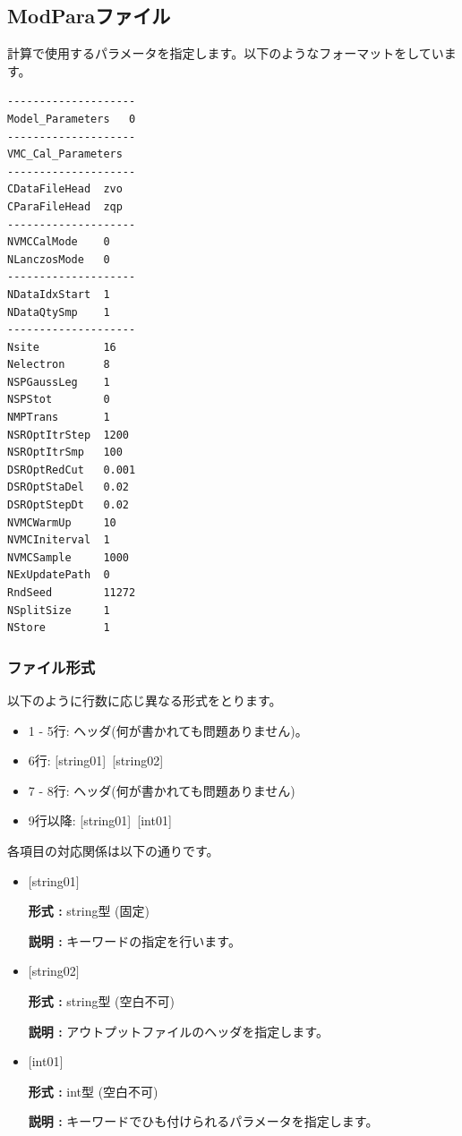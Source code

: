 \newpage
\subsection{ModParaファイル}
\label{Subsec:modpara}
計算で使用するパラメータを指定します。以下のようなフォーマットをしています。\\
\begin{minipage}{10cm}
\begin{screen}
\begin{verbatim}
--------------------
Model_Parameters   0
--------------------
VMC_Cal_Parameters
--------------------
CDataFileHead  zvo
CParaFileHead  zqp
--------------------
NVMCCalMode    0
NLanczosMode   0
--------------------
NDataIdxStart  1
NDataQtySmp    1
--------------------
Nsite          16
Nelectron      8
NSPGaussLeg    1
NSPStot        0
NMPTrans       1
NSROptItrStep  1200
NSROptItrSmp   100
DSROptRedCut   0.001
DSROptStaDel   0.02
DSROptStepDt   0.02
NVMCWarmUp     10
NVMCIniterval  1
NVMCSample     1000
NExUpdatePath  0
RndSeed        11272
NSplitSize     1
NStore         1  
\end{verbatim}
\end{screen}
\end{minipage}

\subsubsection{ファイル形式}
以下のように行数に応じ異なる形式をとります。
 \begin{itemize}
   \item  1 - 5行:  ヘッダ(何が書かれても問題ありません)。
   \item  6行:  [string01]~[string02]
   \item  7 - 8行: ヘッダ(何が書かれても問題ありません)
   \item  9行以降: [string01]~[int01]
  \end{itemize}
各項目の対応関係は以下の通りです。
\begin{itemize}
   \item  $[$string01$]$
   
   {\bf 形式 :} string型 (固定)

  {\bf 説明 :} キーワードの指定を行います。
   
   \item  $[$string02$]$
   
   {\bf 形式 :} string型 (空白不可)

  {\bf 説明 :} アウトプットファイルのヘッダを指定します。

   \item  $[$int01$]$
   
   {\bf 形式 :} int型 (空白不可)

  {\bf 説明 :} キーワードでひも付けられるパラメータを指定します。

  \end{itemize}

